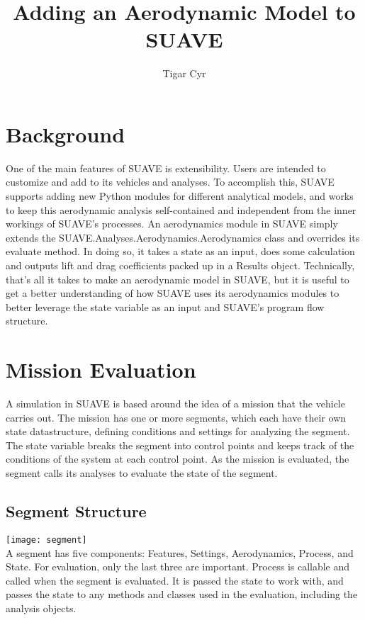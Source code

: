 \documentclass[11pt, oneside]{article}   	%
\title{Adding an Aerodynamic Model to SUAVE}
\author{Tigar Cyr}
\begin{document}
\maketitle
\section{Background}
One of the main features of SUAVE is extensibility.  Users are intended to customize and add to its vehicles and analyses.  To accomplish this, SUAVE supports adding new Python modules for different analytical models, and works to keep this aerodynamic analysis self-contained and independent from the inner workings of SUAVE's processes.  An aerodynamics module in SUAVE simply extends the SUAVE.Analyses.Aerodynamics.Aerodynamics class and overrides its evaluate method.  In doing so, it takes a state as an input, does some calculation and outputs lift and drag coefficients packed up in a Results object.  Technically, that's all it takes to make an aerodynamic model in SUAVE, but it is useful to get a better understanding of how SUAVE uses its aerodynamics modules to better leverage the state variable as an input and SUAVE's program flow structure.
\section{Mission Evaluation}
A simulation in SUAVE is based around the idea of a mission that the vehicle carries out.  The mission has one or more segments, which each have their own state datastructure, defining conditions and settings for analyzing the segment.  The state variable breaks the segment into control points and keeps track of the conditions of the system at each control point. As the mission is evaluated, the segment calls its analyses to evaluate the state of the segment.
\subsection{Segment Structure}
\texttt{[image: segment]}\\
A segment has five components: Features, Settings, Aerodynamics, Process, and State.  For evaluation, only the last three are important. Process is callable and called when the segment is evaluated.  It is passed the state to work with, and passes the state to any methods and classes used in the evaluation, including the analysis objects.
\end{document}
